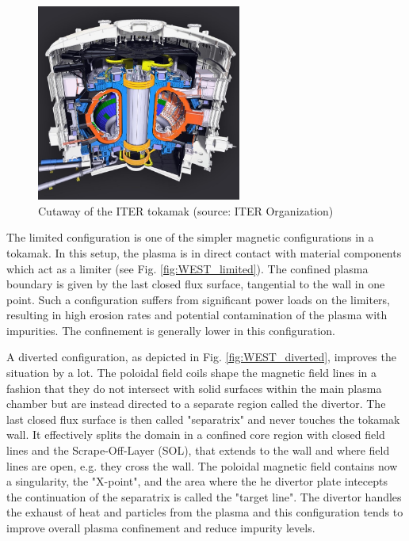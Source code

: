 \begin{figure}[H]
	\centering
	\includegraphics[width=0.6\textwidth]{schemes/ITER_2.jpg}
	\caption{Cutaway of the ITER tokamak (source: ITER Organization)}
	\label{fig:1_ITER}
\end{figure}

The limited configuration is one of the simpler magnetic configurations in a tokamak. In this setup, the plasma is in direct contact with material components which act as a limiter (see Fig. \ref{fig:WEST_limited}). The confined plasma boundary is given by the last closed flux surface, tangential to the wall in one point. Such a configuration suffers from significant power loads on the limiters, resulting in high erosion rates and potential contamination of the plasma with impurities. The confinement is generally lower in this configuration.

A diverted configuration, as depicted in Fig. \ref{fig:WEST_diverted}, improves the situation by a lot. The poloidal field coils shape the magnetic field lines in a fashion that they do not intersect with solid surfaces within the main plasma chamber but are instead directed to a separate region called the divertor. The last closed flux surface is then called "separatrix" and never touches the tokamak wall. It effectively splits the domain in a confined core region with closed field lines and the Scrape-Off-Layer (SOL), that extends to the wall and where field lines are open, e.g. they cross the wall. The poloidal magnetic field contains now a singularity, the "X-point", and the area where the he divertor plate intecepts the continuation of the separatrix is called the "target line". The divertor handles the exhaust of heat and particles from the plasma and this configuration tends to improve overall plasma confinement and reduce impurity levels.

